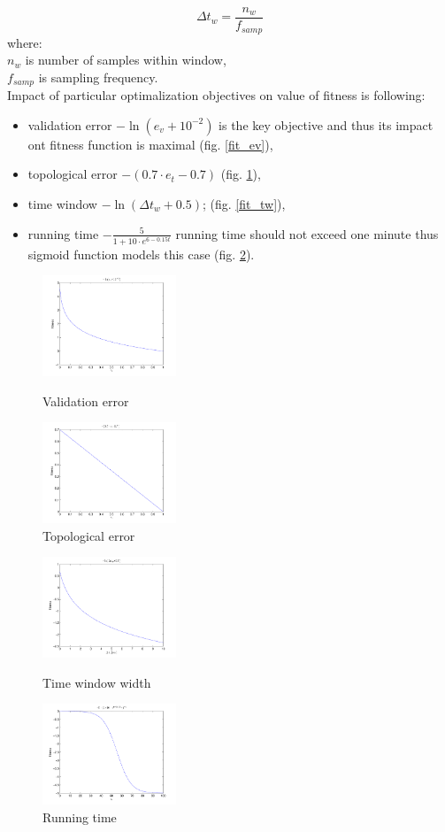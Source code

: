 \documentclass[a4paper]{IEEEtran}
\begin{document}
\[  \Delta t_w = \frac{n_w}{f_{samp}}  \]
where:\\
$ n_w $ is number of samples within window,\\
$ f_{samp} $ is sampling frequency.
\\
Impact of particular optimalization objectives on value of fitness is following:
\begin{itemize}
	\item validation error $ -\ln(e_v+10^{-2 }) $ is the key objective and thus its impact
	ont fitness function is maximal (fig. \ref{fit_ev}),
	\item topological error $ -(0.7\cdot e_t-0.7) $ (fig. \ref{fit_et}),
	\item time window $ -\ln(\Delta t_w+0.5) $; (fig. \ref{fit_tw}),
	\item running time $ -\frac{5}{1+10\cdot e^{6-0.15t}} $ running
	time should not exceed one minute thus sigmoid function models this case (fig.
	 \ref{fit_tr}).
\end{itemize}


\begin{figure}[h] %
	\centering
	\parbox{40mm}{
		\includegraphics[width=40mm]{fit_ev}
		\caption{Validation error}
		\label{fit_ev}
	}
	\qquad
	\parbox{40mm}{
		\includegraphics[width=40mm]{fit_et}
		\caption{Topological error}
		\label{fit_et}
	}
\end{figure}
\begin{figure}[h] %
	\parbox{40mm}{
		\includegraphics[width=40mm]{fit_tw}
		\caption{Time window width}
		\label{fit_tw}
	}
	\qquad
	\parbox{40mm}{
		\includegraphics[width=40mm]{fit_tr}
		\caption{Running time}
		\label{fit_tr}
	}
\end{figure}
\end{document}
